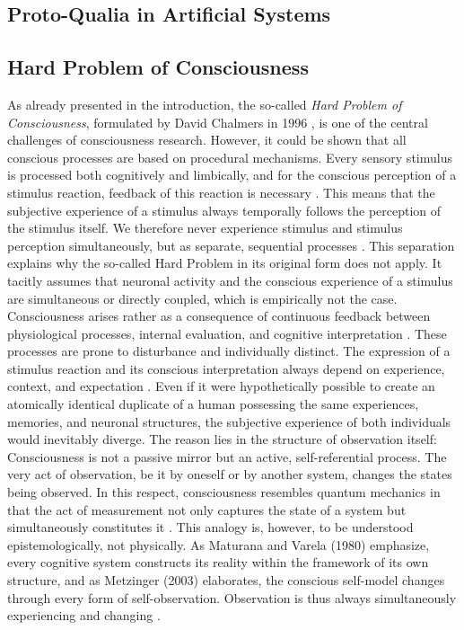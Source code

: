 \subsection*{Proto-Qualia in Artificial Systems}

\subsection*{Hard Problem of Consciousness}

As already presented in the introduction, the so-called \emph{Hard Problem of Consciousness}, formulated by David Chalmers in 1996 \cite{Chalmers1996}, is one of the central challenges of consciousness research.
However, it could be shown that all conscious processes are based on procedural mechanisms.
Every sensory stimulus is processed both cognitively and limbically, and for the conscious perception of a stimulus reaction, feedback of this reaction is necessary \cite{Damasio1999, Craig2009}.
This means that the subjective experience of a stimulus always temporally follows the perception of the stimulus itself.
We therefore never experience stimulus and stimulus perception simultaneously, but as separate, sequential processes \cite{Libet1993, LeDoux1996}.
This separation explains why the so-called Hard Problem in its original form does not apply.
It tacitly assumes that neuronal activity and the conscious experience of a stimulus are simultaneous or directly coupled, which is empirically not the case.
Consciousness arises rather as a consequence of continuous feedback between physiological processes, internal evaluation, and cognitive interpretation \cite{Damasio1994, Craig2002}.
These processes are prone to disturbance and individually distinct. The expression of a stimulus reaction and its conscious interpretation always depend on experience, context, and expectation \cite{Barrett2017}.
Even if it were hypothetically possible to create an atomically identical duplicate of a human possessing the same experiences, memories, and neuronal structures, the subjective experience of both individuals would inevitably diverge.
The reason lies in the structure of observation itself: Consciousness is not a passive mirror but an active, self-referential process.
The very act of observation, be it by oneself or by another system, changes the states being observed.
In this respect, consciousness resembles quantum mechanics in that the act of measurement not only captures the state of a system but simultaneously constitutes it \cite{Heisenberg1927}.
This analogy is, however, to be understood epistemologically, not physically.
As Maturana and Varela (1980) emphasize, every cognitive system constructs its reality within the framework of its own structure, and as Metzinger (2003) elaborates, the conscious self-model changes through every form of self-observation.
Observation is thus always simultaneously experiencing and changing \cite{Maturana1980,Metzinger2003}.

